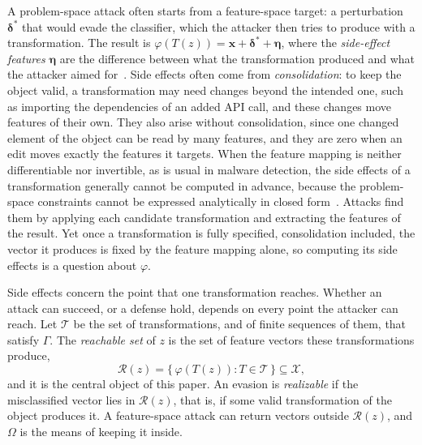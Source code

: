 A problem-space attack often starts from a feature-space target: a perturbation $\boldsymbol{\delta}^*$ that would
evade the classifier, which the attacker then tries to produce with a transformation. The result is $\varphi(T(z)) =
\mathbf{x} + \boldsymbol{\delta}^* + \boldsymbol{\eta}$, where the \emph{side-effect features} $\boldsymbol{\eta}$ are
the difference between what the transformation produced and what the attacker aimed for~\cite{pierazzi2020intriguing}.
Side effects often come from \emph{consolidation}: to keep the object valid, a transformation may need changes beyond
the intended one, such as importing the dependencies of an added API call, and these changes move features of their
own. They also arise without consolidation, since one changed element of the object can be read by many features, and
they are zero when an edit moves exactly the features it targets. When the feature mapping is neither differentiable
nor invertible, as is usual in malware detection, the side effects of a transformation generally cannot be computed in
advance, because the problem-space constraints cannot be expressed analytically in closed
form~\cite{pierazzi2020intriguing}. Attacks find them by applying each candidate transformation and extracting the
features of the result. Yet once a transformation is fully specified, consolidation included, the vector it
produces is fixed by the feature mapping alone, so computing its side effects is a question about $\varphi$.


Side effects concern the point that one transformation reaches. Whether an attack can succeed, or a defense hold,
depends on every point the attacker can reach. Let $\mathcal{T}$ be the set of transformations, and of finite sequences
of them, that satisfy $\Gamma$. The \emph{reachable set} of $z$ is the set of feature vectors these transformations
produce,
\[
  \mathcal{R}(z) = \{\, \varphi(T(z)) : T \in \mathcal{T} \,\} \subseteq \mathcal{X},
\]
and it is the central object of this paper. An evasion is \emph{realizable} if the misclassified vector lies in
$\mathcal{R}(z)$, that is, if some valid transformation of the object produces it. A feature-space attack can return
vectors outside $\mathcal{R}(z)$, and $\Omega$ is the means of keeping it inside.

